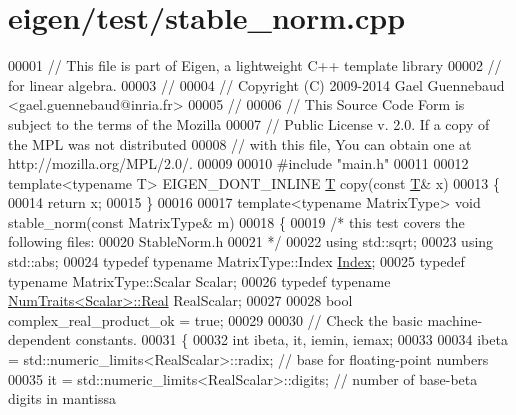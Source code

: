 \hypertarget{eigen_2test_2stable__norm_8cpp_source}{}\section{eigen/test/stable\+\_\+norm.cpp}
\label{eigen_2test_2stable__norm_8cpp_source}

\begin{DoxyCode}
00001 \textcolor{comment}{// This file is part of Eigen, a lightweight C++ template library}
00002 \textcolor{comment}{// for linear algebra.}
00003 \textcolor{comment}{//}
00004 \textcolor{comment}{// Copyright (C) 2009-2014 Gael Guennebaud <gael.guennebaud@inria.fr>}
00005 \textcolor{comment}{//}
00006 \textcolor{comment}{// This Source Code Form is subject to the terms of the Mozilla}
00007 \textcolor{comment}{// Public License v. 2.0. If a copy of the MPL was not distributed}
00008 \textcolor{comment}{// with this file, You can obtain one at http://mozilla.org/MPL/2.0/.}
00009 
00010 \textcolor{preprocessor}{#include "main.h"}
00011 
00012 \textcolor{keyword}{template}<\textcolor{keyword}{typename} T> EIGEN\_DONT\_INLINE \hyperlink{group___sparse_core___module}{T} copy(\textcolor{keyword}{const} \hyperlink{group___sparse_core___module}{T}& x)
00013 \{
00014   \textcolor{keywordflow}{return} x;
00015 \}
00016 
00017 \textcolor{keyword}{template}<\textcolor{keyword}{typename} MatrixType> \textcolor{keywordtype}{void} stable\_norm(\textcolor{keyword}{const} MatrixType& m)
00018 \{
00019   \textcolor{comment}{/* this test covers the following files:}
00020 \textcolor{comment}{     StableNorm.h}
00021 \textcolor{comment}{  */}
00022   \textcolor{keyword}{using} std::sqrt;
00023   \textcolor{keyword}{using} std::abs;
00024   \textcolor{keyword}{typedef} \textcolor{keyword}{typename} MatrixType::Index \hyperlink{namespace_eigen_a62e77e0933482dafde8fe197d9a2cfde}{Index};
00025   \textcolor{keyword}{typedef} \textcolor{keyword}{typename} MatrixType::Scalar Scalar;
00026   \textcolor{keyword}{typedef} \textcolor{keyword}{typename} \hyperlink{group___core___module_struct_eigen_1_1_num_traits}{NumTraits<Scalar>::Real} RealScalar;
00027   
00028   \textcolor{keywordtype}{bool} complex\_real\_product\_ok = \textcolor{keyword}{true};
00029 
00030   \textcolor{comment}{// Check the basic machine-dependent constants.}
00031   \{
00032     \textcolor{keywordtype}{int} ibeta, it, iemin, iemax;
00033 
00034     ibeta = std::numeric\_limits<RealScalar>::radix;         \textcolor{comment}{// base for floating-point numbers}
00035     it    = std::numeric\_limits<RealScalar>::digits;        \textcolor{comment}{// number of base-beta digits in mantissa}

\end{DoxyCode}
